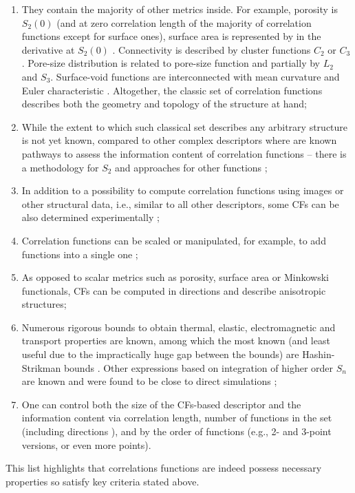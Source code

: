 \documentclass[reprint,amsmath,amssymb,aps,pre,showkeys,showpacs]{revtex4-1}
\begin{document}
\begin{enumerate}
  \item They contain the majority of other metrics inside. For example, porosity
    is $S_2(0)$ (and at zero correlation length of the majority of correlation
    functions except for surface ones), surface area is represented by in the
    derivative at $S_2(0)$ \cite{debye1957scattering}. Connectivity is described by cluster
    functions $C_2$ or $C_3$. Pore-size distribution is related to pore-size
    function and partially by $L_2$ and $S_3$. Surface-void functions are
    interconnected with mean curvature and Euler characteristic
    \cite{ma2020generation}. Altogether, the classic set of correlation
    functions describes both the geometry and topology of the structure at hand;
  \item While the extent to which such classical set describes any arbitrary
    structure is not yet known, compared to other complex descriptors where are
    known pathways to assess the information content of correlation functions --
    there is a methodology for $S_2$ \cite{Gommes2} and approaches for other
    functions \cite{Degeneraty.045306,cherkasov2023towards};
  \item In addition to a possibility to compute correlation functions using
    images or other structural data, i.e., similar to all other descriptors,
    some CFs can be also determined experimentally
    \cite{debye1957scattering,barrall1992nmr,dietrich1995scattering,li2018accurate};
  \item Correlation functions can be scaled \cite{karsaninaPRL} or manipulated,
    for example, to add functions into a single one \cite{moctezuma2002};
  \item As opposed to scalar metrics such as porosity, surface area or Minkowski
    functionals, CFs can be computed in directions and describe anisotropic
    structures;
  \item Numerous rigorous bounds to obtain thermal, elastic, electromagnetic and
    transport properties are known, among which the most known (and least useful
    due to the impractically huge gap between the bounds) are Hashin-Strikman
    bounds \cite{hashin1963variational}. Other expressions based on integration
    of higher order $S_n$ are known and were found to be close to direct
    simulations
    \cite{brown1955solid,beran1965use,milton1981bounds,hlushkou2015effective};
  \item One can control both the size of the CFs-based descriptor and the
    information content via correlation length, number of functions in the set
    (including directions \cite{EPL2}), and by the order of functions (e.g., 2-
    and 3-point versions, or even more points).
\end{enumerate}
This list highlights that correlations functions are indeed possess necessary
properties so satisfy key criteria stated above.
\end{document}
